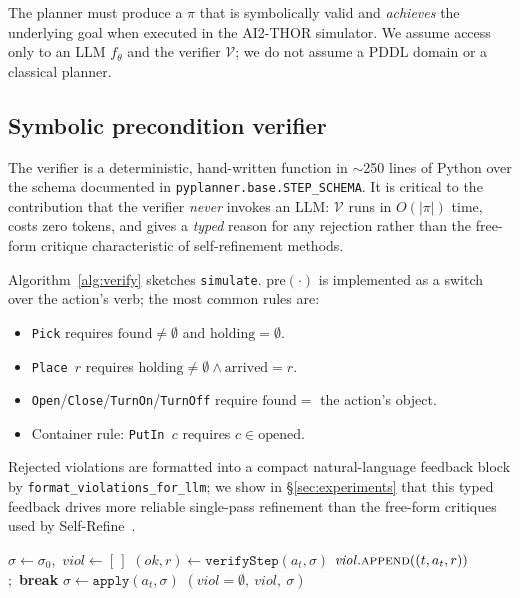 The planner must produce a $\pi$ that is symbolically valid and
\emph{achieves} the underlying goal when executed in the AI2-THOR
simulator. We assume access only to an LLM $f_\theta$ and the
verifier $\mathcal{V}$; we do not assume a PDDL domain or a
classical planner.

\subsection{Symbolic precondition verifier}\label{sec:verifier}

The verifier is a deterministic, hand-written function in
$\sim$250 lines of Python over the schema documented in
\texttt{pyplanner.base.STEP\_SCHEMA}. It is critical to the
contribution that the verifier \emph{never} invokes an LLM:
$\mathcal{V}$ runs in $O(|\pi|)$ time, costs zero tokens, and gives a
\emph{typed} reason for any rejection rather than the free-form
critique characteristic of self-refinement methods.

Algorithm~\ref{alg:verify} sketches \texttt{simulate}.
$\mathrm{pre}(\cdot)$ is implemented as a switch over the action's
verb; the most common rules are:
\begin{itemize}
  \item \texttt{Pick} requires $\mathrm{found} \neq \emptyset$
    and $\mathrm{holding} = \emptyset$.
  \item \texttt{Place~$r$} requires
    $\mathrm{holding} \neq \emptyset \wedge \mathrm{arrived} = r$.
  \item \texttt{Open}/\texttt{Close}/\texttt{TurnOn}/\texttt{TurnOff} require
    $\mathrm{found} = $ the action's object.
  \item Container rule: \texttt{PutIn~$c$} requires
    $c \in \mathrm{opened}$.
\end{itemize}
Rejected violations are formatted into a compact natural-language
feedback block by \texttt{format\_violations\_for\_llm}; we show in
\S\ref{sec:experiments} that this typed feedback drives more reliable
single-pass refinement than the free-form critiques used by
Self-Refine~\cite{madaan2023selfrefine}.

\begin{algorithm}
\caption{\texttt{simulate}: rule-based plan verification.}\label{alg:verify}
\begin{algorithmic}[1]
\State $\sigma \gets \sigma_0$,\ $\mathit{viol} \gets [\,]$
  \State $(\mathit{ok}, r) \gets \texttt{verifyStep}(a_t, \sigma)$
     \State $\mathit{viol}.\textsc{append}((t, a_t, r))$;\ \textbf{break}
  \EndIf
  \State $\sigma \gets \texttt{apply}(a_t, \sigma)$
\EndFor
\State \Return $(\mathit{viol}=\emptyset,\ \mathit{viol},\ \sigma)$
\end{algorithmic}
\end{algorithm}

